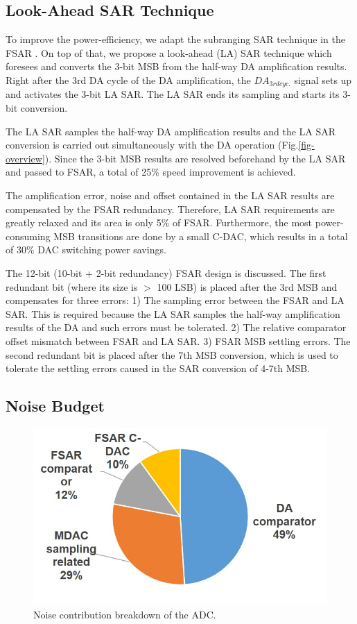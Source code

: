 \subsection{Look-Ahead SAR Technique}
To improve the power-efficiency, we adapt the subranging SAR technique in the FSAR \cite{tai201411}. On top of that, we propose a look-ahead (LA) SAR technique which foresees and converts the 3-bit MSB from the half-way DA amplification results. Right after the 3rd DA cycle of the DA amplification, the $DA_{3rd cyc.}$ signal sets up and activates the 3-bit LA SAR. The LA SAR ends its sampling and starts its 3-bit conversion. 

The LA SAR samples the half-way DA amplification results and the LA SAR conversion is carried out simultaneously with the DA operation (Fig.\ref{fig-overview}). Since the 3-bit MSB results are resolved beforehand by the LA SAR and passed to FSAR, a total of 25\% speed improvement is achieved.

The amplification error, noise and offset contained in the LA SAR results are compensated by the FSAR redundancy. Therefore, LA SAR requirements are greatly relaxed and its area is only 5\% of FSAR. Furthermore, the most power-consuming MSB transitions are done by a small C-DAC, which results in a total of 30\% DAC switching power savings.

The 12-bit (10-bit + 2-bit redundancy) FSAR design is discussed. The first redundant bit (where its size is $>$ 100 LSB) is placed after the 3rd MSB and compensates for three errors:
1) The sampling error between the FSAR and LA SAR. This is required because the LA SAR samples the half-way amplification results of the DA and such errors must be tolerated.
2) The relative comparator offset mismatch between FSAR and LA SAR.
3) FSAR MSB settling errors.
The second redundant bit is placed after the 7th MSB conversion, which is used to tolerate the settling errors caused in the SAR conversion of 4-7th MSB.

\subsection{Noise Budget}
\begin{figure}[!]
\centering
  
 \includegraphics[width=1\textwidth]{figure/chap2/noise-breakdown.jpg}
 \caption{Noise contribution breakdown of the ADC.}
 \label{noise}
\end{figure}

